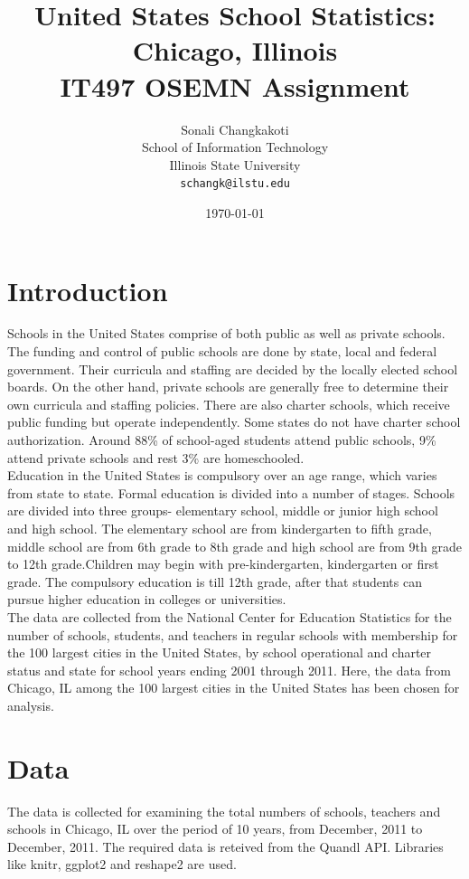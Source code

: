 \documentclass{article}\usepackage[]{graphicx}\usepackage[]{color}
\begin{document}
\title {United States School Statistics: Chicago, Illinois
\\ IT497 OSEMN Assignment}
\author { Sonali Changkakoti
\\ School of Information Technology 
\\ Illinois State University
\\
\texttt{schangk@ilstu.edu}}
\date{\today} 
\maketitle


\section{Introduction}
Schools in the United States comprise of both public as well as private schools. The funding and control of public schools are done by state, local and federal government. Their curricula and staffing are decided by the locally elected school boards. On the other hand, private schools are generally free to determine their own curricula and staffing policies. There are also charter schools, which receive public funding but operate independently. Some states do not have charter school authorization. Around 88\% of school-aged students attend public schools, 9\% attend private schools and rest 3\% are homeschooled. 
\\Education in the United States is compulsory over an age range, which varies from state to state.  Formal education is divided into a number of stages. Schools are divided into three groups- elementary school, middle or junior high school and high school. The elementary school are from kindergarten to fifth grade, middle school are from 6th grade to 8th grade and high school are from 9th grade to 12th grade.Children may begin with pre-kindergarten, kindergarten or first grade. The compulsory education is till 12th grade, after that students can pursue higher education in colleges or universities.  
\\The data are collected from the National Center for Education Statistics for the number of schools, students, and teachers in regular schools with membership for the 100 largest cities in the United States, by school operational and charter status and state for school years ending 2001 through 2011. Here, the data from Chicago, IL among the 100 largest cities in the United States has been chosen for analysis.


\section {Data}
The data is collected for examining the total numbers of schools, teachers and schools in Chicago, IL over the period of 10 years, from December, 2011 to December, 2011. The required data is reteived from the Quandl API. Libraries like knitr, ggplot2 and reshape2 are used.
\end{document}
